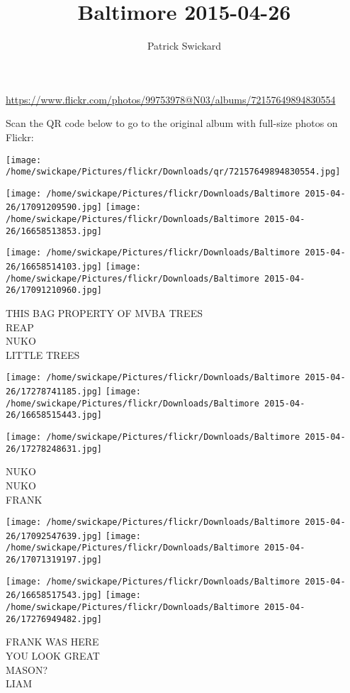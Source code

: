 \documentclass[10pt,letterpaper]{article}
\title{Baltimore 2015-04-26}
\author{Patrick Swickard}
\date{}
\begin{document}
\maketitle

\url{https://www.flickr.com/photos/99753978@N03/albums/72157649894830554}

Scan the QR code below to go to the original album with full-size photos on Flickr:

\texttt{[image: /home/swickape/Pictures/flickr/Downloads/qr/72157649894830554.jpg]}
\pagebreak

\texttt{[image: /home/swickape/Pictures/flickr/Downloads/Baltimore 2015-04-26/17091209590.jpg]}
\texttt{[image: /home/swickape/Pictures/flickr/Downloads/Baltimore 2015-04-26/16658513853.jpg]}

\texttt{[image: /home/swickape/Pictures/flickr/Downloads/Baltimore 2015-04-26/16658514103.jpg]}
\texttt{[image: /home/swickape/Pictures/flickr/Downloads/Baltimore 2015-04-26/17091210960.jpg]}

THIS BAG PROPERTY OF MVBA TREES\\
REAP\\
NUKO\\
LITTLE TREES
\pagebreak

\texttt{[image: /home/swickape/Pictures/flickr/Downloads/Baltimore 2015-04-26/17278741185.jpg]}
\texttt{[image: /home/swickape/Pictures/flickr/Downloads/Baltimore 2015-04-26/16658515443.jpg]}

\vspace{0.25in}
\texttt{[image: /home/swickape/Pictures/flickr/Downloads/Baltimore 2015-04-26/17278248631.jpg]}

NUKO\\
NUKO\\
FRANK
\pagebreak

\texttt{[image: /home/swickape/Pictures/flickr/Downloads/Baltimore 2015-04-26/17092547639.jpg]}
\texttt{[image: /home/swickape/Pictures/flickr/Downloads/Baltimore 2015-04-26/17071319197.jpg]}

\texttt{[image: /home/swickape/Pictures/flickr/Downloads/Baltimore 2015-04-26/16658517543.jpg]}
\texttt{[image: /home/swickape/Pictures/flickr/Downloads/Baltimore 2015-04-26/17276949482.jpg]}

FRANK WAS HERE\\
YOU LOOK GREAT\\
MASON?\\
LIAM
\pagebreak
\end{document}
